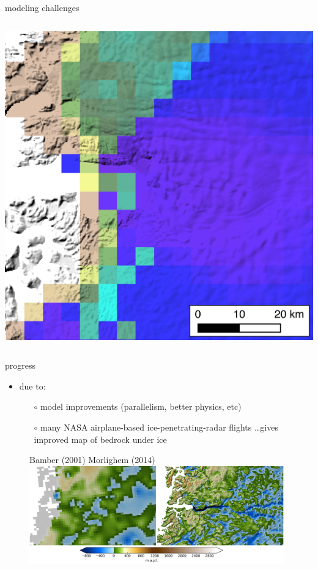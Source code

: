 \documentclass[hide notes,intlimits]{beamer}
\begin{document}
\begin{frame}{modeling challenges}
\begin{columns}
\medskip
    \includegraphics[width=\textwidth]{jakobshavn-speed-exp-4500m-ba01}
  \end{columns}
\end{frame}


\begin{frame}{progress}

\begin{itemize}
\item due to:
    \begin{itemize}
    \item[$\circ$] model improvements (parallelism, better physics, etc)
    \item[$\circ$] many NASA airplane-based ice-penetrating-radar flights \dots gives improved map of bedrock under ice
    \end{itemize}
\end{itemize}

  \begin{figure}
    \small{Bamber (2001) \hspace{5em} Morlighem (2014)}
    \includegraphics[width=11cm]{jako_bed}
 \end{figure}
\end{frame}
\end{document}
